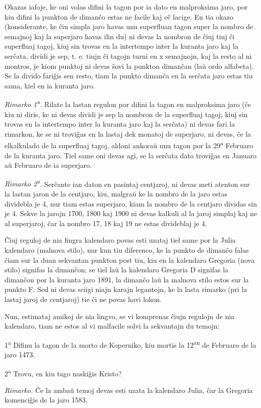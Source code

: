    Okazas iafoje, ke oni volas difini la tagon por ia dato en
malproksima jaro, por kiu difini la punkton de diman\^co estas ne
facile kaj e\^c lacige. En tia okazo (konsiderante, ke \^ciu simpla
jaro havas unu superfluan tagon super la nombro de semajnoj kaj la
superjaro havas ilin du) ni devas la nombron de \^ciuj tiuj \^ci
superfluaj tagoj, kiuj sin trovas en la intertempo inter la kuranta
jaro kaj la ser\^cata, dividi je sep, t. e. tiujn \^ci tagojn turni
en x semajnojn, kaj la resto al ni montros, je kiom punktoj ni devas
\^sovi la punkton diman\^can (la\u u ordo alfabeta). Se la divido
fari\^gis sen resto, tiam la punkto diman\^ca en la ser\^cata jaro
estas tiu sama, kiel en ia kuranta jaro.

{\it Rimarko 1\textsuperscript{a}.} Rilate la lastan regulon por difini la tagon en
malproksima jaro (\^ce kiu ni diris, ke ni devas dividi je sep la
nombron de la superfluaj tagoj, kiuj sin trovas en la intertempo
inter la kuranta jaro kaj la ser\^cata) ni devas fari la rimarkon,
ke se ni trovi\^gas en la lastaj dek monatoj de superjaro, ni devas,
\^ce la elkalkulado de la superfluaj tagoj, aldoni ankora\u u unu
tagon por la 29\textsuperscript{a} Februaro de la kuranta jaro. Tiel same oni devas
agi, se la ser\^cata dato trovi\^gas en Januaro a\u u Februaro de ia
superjaro.

{\it Rimarko 2\textsuperscript{a}.} Ser\^cante ian daton en pasintaj centjaroj, ni
devas meti atenton sur la lastan jaron de la centjaro, kiu, malgra\u
u ke la nombro de la jaro estas dividebla je 4, nur tiam estas
superjaro, kiam la nombro de la centjaro dividas sin je 4. Sekve la
jarojn 1700, 1800 kaj 1900 ni devas kalkuli al la jaroj simplaj kaj
ne al superjaroj, \^car la nombro 17, 18 kaj 19 ne estas divideblaj
je 4.

   \^Ciuj reguloj de nia fingra kalendaro povas esti uzataj tiel same por
la Julia kalendaro (malnova stilo), nur kun tiu diferenco, ke la
punkto de diman\^co falas \^ciam sur la duan sekvantan punkton post
tiu, kiu en la kalendaro Gregoria (nova stilo) signifas la
diman\^con; se tiel la\u u la kalendaro Gregoria D signifas la
diman\^con por la kuranta jaro 1891, la diman\^co la\u u la malnova
stilo estos sur la punkto F. Sed ni devas sciigi niajn karajn
legantojn, ke la lasta rimarko (pri la lastaj jaroj de centjaroj)
tie \^ci ne povas havi lokon.

   Nun, estimataj amikoj de nia lingvo, se vi komprenas \^ciujn regulojn
de nia kalendaro, tiam ne estos al vi malfacile solvi la sekvantajn
du temojn:

   1\textsuperscript{a} Difinu la tagon de la morto de Koperniko, kiu mortis la 12\textsuperscript{an} de
Februaro de la jaro 1473.

   2\textsuperscript{a} Trovu, en kiu tago naski\^gis Kristo?

{\it Rimarko.} \^Ce la amba\u u temoj devas esti uzata la kalendaro
Julia, \^car la Gregoria komenci\^gis de la jaro 1583.

\smallrule{}
